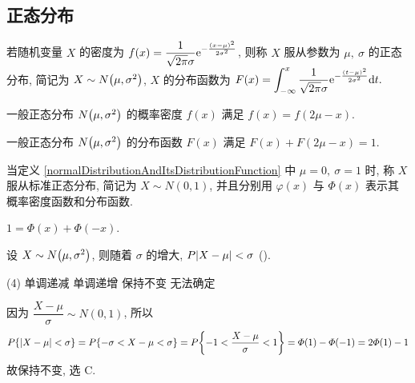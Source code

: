 \subsection{正态分布}

\begin{definition}[正态分布及其分布函数]
    \label{normalDistributionAndItsDistributionFunction}
    若随机变量 $X$ 的密度为 $f(x)=\dfrac{1}{\sqrt{2\pi}\sigma}\mathrm{e}^{-\frac{(x-\mu)^2}{2\sigma^2}}$, 则称 $X$ 服从参数为 $\mu,~\sigma$ 的正态分布, 简记为 $X\sim N\qty(\mu,\sigma^2)$, $X$ 的分布函数为 $\displaystyle F(x)=\int_{-\infty}^{x}\dfrac{1}{\sqrt{2\pi}\sigma}\mathrm{e}^{-\frac{(t-\mu)^2}{2\sigma^2}}\dd t.$
\end{definition}

\begin{theorem}[对称性]
    一般正态分布 $N\qty(\mu,\sigma^2)$ 的概率密度 $f(x)$ 满足 $f(x)=f(2\mu-x).$
\end{theorem}
\begin{theorem}[和一性]
    一般正态分布 $N\qty(\mu,\sigma^2)$ 的分布函数 $F(x)$ 满足 $F(x)+F(2\mu-x)=1.$
\end{theorem}

\begin{definition}[标准正态分布]
    当定义 \ref{normalDistributionAndItsDistributionFunction} 中 $\mu=0,~\sigma=1$ 时, 称 $X$ 服从标准正态分布, 简记为 $X\sim N(0,1)$, 并且分别用 $\varphi(x)$ 与 $\varPhi(x)$ 表示其概率密度函数和分布函数.
\end{definition}

\begin{theorem}[标准正态分布的分布函数和]
    $1=\varPhi(x)+\varPhi(-x)$.
\end{theorem}

\begin{example}
    设 $X \sim N\qty(\mu,\sigma^2)$, 则随着 $\sigma$ 的增大, $P\qty|X-\mu|<\sigma$ (\quad).
    \begin{tasks}(4)
        \task 单调递减
        \task 单调递增
        \task 保持不变
        \task 无法确定
    \end{tasks}
\end{example}
\begin{solution}
    因为 $\dfrac{X-\mu}{\sigma}\sim N(0,1)$, 所以
    $$
        P\qty{|X-\mu|<\sigma}=P\qty{-\sigma<X-\mu<\sigma}=P\qty{-1<\dfrac{X-\mu}{\sigma}<1}=\varPhi(1)-\varPhi(-1)=2\varPhi(1)-1
    $$
    故保持不变, 选 C.
\end{solution}

